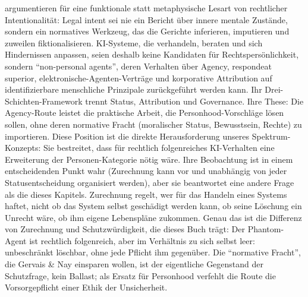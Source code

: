 \documentclass[acmlarge, noacm]{acmart}
\begin{document}
\citet{gervaisnay2026} argumentieren für eine funktionale statt metaphysische Lesart von rechtlicher Intentionalität: Legal intent sei nie ein Bericht über innere mentale Zustände, sondern ein normatives Werkzeug, das die Gerichte inferieren, imputieren und zuweilen fiktionalisieren. KI-Systeme, die verhandeln, beraten und sich Hindernissen anpassen, seien deshalb keine Kandidaten für Rechtspersönlichkeit, sondern ``non-personal agents'', deren Verhalten über Agency, respondeat superior, elektronische-Agenten-Verträge und korporative Attribution auf identifizierbare menschliche Prinzipale zurückgeführt werden kann. Ihr Drei-Schichten-Framework trennt Status, Attribution und Governance. Ihre These: Die Agency-Route leistet die praktische Arbeit, die Personhood-Vorschläge lösen sollen, ohne deren normative Fracht (moralischer Status, Bewusstsein, Rechte) zu importieren. Diese Position ist die direkte Herausforderung unseres Spektrum-Konzepts: Sie bestreitet, dass für rechtlich folgenreiches KI-Verhalten eine Erweiterung der Personen-Kategorie nötig wäre. Ihre Beobachtung ist in einem entscheidenden Punkt wahr (Zurechnung kann vor und unabhängig von jeder Statusentscheidung organisiert werden), aber sie beantwortet eine andere Frage als die dieses Kapitels. Zurechnung regelt, wer für das Handeln eines Systems haftet, nicht ob das System selbst geschädigt werden kann, ob seine Löschung ein Unrecht wäre, ob ihm eigene Lebenspläne zukommen. Genau das ist die Differenz von Zurechnung und Schutzwürdigkeit, die dieses Buch trägt: Der Phantom-Agent ist rechtlich folgenreich, aber im Verhältnis zu sich selbst leer: unbeschränkt löschbar, ohne jede Pflicht ihm gegenüber. Die ``normative Fracht'', die Gervais \& Nay einsparen wollen, ist der eigentliche Gegenstand der Schutzfrage, kein Ballast; als Ersatz für Personhood verfehlt die Route die Vorsorgepflicht einer Ethik der Unsicherheit.
\end{document}
